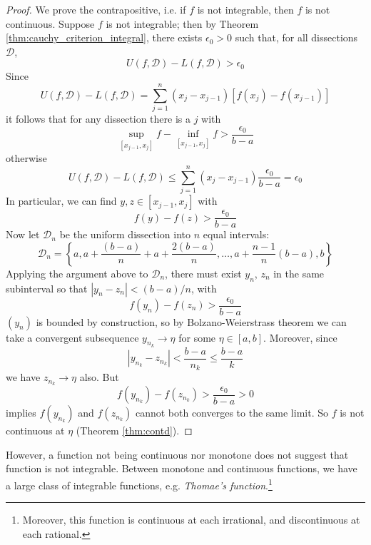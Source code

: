 \documentclass[10pt, a4paper, twoside]{report}
\begin{document}
\begin{proof}
    We prove the contrapositive, i.e. if \(f\) is not integrable, then \(f\) is not continuous. Suppose \(f\) is not integrable; then by Theorem \ref{thm:cauchy_criterion_integral}, there exists \(\epsilon_0>0\) such that, for all dissections \(\mathcal{D}\),
    \[U(f,\mathcal{D})-L(f,\mathcal{D})>\epsilon_0\]
    Since
    \[U(f,\mathcal{D})-L(f,\mathcal{D})=\sum_{j=1}^{n}(x_j-x_{j-1})[f(x_j)-f(x_{j-1})]\]
    it follows that for any dissection there is a \(j\) with 
    \[\sup_{[x_{j-1},x_j]}f-\inf_{[x_{j-1},x_j]}f>\frac{\epsilon_0}{b-a}\]
    otherwise
    \[U(f,\mathcal{D})-L(f,\mathcal{D})\leq\sum_{j=1}^{n}(x_j-x_{j-1})\frac{\epsilon_0}{b-a}=\epsilon_0\]
    In particular, we can find \(y,z\in[x_{j-1},x_j]\) with 
    \[f(y)-f(z)>\frac{\epsilon_0}{b-a}\]
    Now let \(\mathcal{D}_n\) be the uniform dissection into \(n\) equal intervals:
    \[\mathcal{D}_n=\left\{a,a+\frac{(b-a)}{n}+a+\frac{2(b-a)}{n},\ldots,a+\frac{n-1}{n}(b-a),b\right\}\]
    Applying the argument above to \(\mathcal{D}_n\), there must exist \(y_n\), \(z_n\) in the same subinterval so that \(|y_n-z_n|<(b-a)/n\), with 
    \[f(y_n)-f(z_n)>\frac{\epsilon_0}{b-a}\]
    \((y_n)\) is bounded by construction, so by Bolzano-Weierstrass theorem we can take a convergent subsequence \(y_{n_k}\to\eta\) for some \(\eta\in[a,b]\). Moreover, since
    \[|y_{n_k}-z_{n_k}|<\frac{b-a}{n_k}\leq\frac{b-a}{k}\]
    we have \(z_{n_k}\to\eta\) also. But 
    \[f(y_{n_k})-f(z_{n_k})>\frac{\epsilon_0}{b-a}>0\]
    implies \(f(y_{n_k})\) and \(f(z_{n_k})\) cannot both converges to the same limit. So \(f\) is not continuous at \(\eta\) (Theorem \ref{thm:contd}).
\end{proof}
However, a function not being continuous nor monotone does not suggest that function is not integrable. Between monotone and continuous functions, we have a large class of integrable functions, e.g. \emph{Thomae's function}.\footnote{Moreover, this function is continuous at each irrational, and discontinuous at each rational.}
\end{document}
